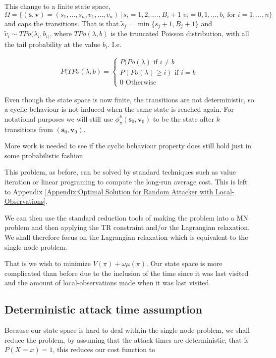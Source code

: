 \documentclass[a4paper,10pt]{article}
\theoremstyle{definition}
\theoremstyle{definition}
\theoremstyle{remark}
\theoremstyle{definition}
\begin{document}
This change to a finite state space, $\Omega = \{ (\bm{s},\bm{v})=(s_{1},...,s_{n},v_{1},...,v_{n}) \, | \, s_{i}=1,2,....,B_{i}+1 \; v_{i}=0,1,...,b_{i}  \text{ for } i=1,...,n\}$ and caps the transitions. That is that $\widetilde{s}_{j}= \min \{s_{j}+1, B_{j}+1 \}$ and $\widetilde{v}_{i} \sim TPo(\lambda_{i},b_{i)}$, where $TPo(\lambda,b)$ is the truncated Poisson distribution, with all the tail probability at the value $b_{i}$. I.e.

\begin{align*}
P(TPo(\lambda,b)=\begin{cases}
P(Po(\lambda) \text{ if } i \neq b \\
P(Po(\lambda) \geq i) \text{ if } i=b \\
0 \text{ Otherwise}
\end{cases}
\end{align*}

Even though the state space is now finite, the transitions are not deterministic, so a cyclic behaviour is not induced when the same state is reached again. For notational purposes we will still use $\phi^{k}_{\pi}(\bm{s}_{0},\bm{v}_{0})$ to be the state after $k$ transitions from $(\bm{s}_{0},\bm{v}_{0})$.

\begin{Huge}
More work is needed to see if the cyclic behaviour property does still hold just in some probabilistic fashion
\end{Huge}

This problem, as before, can be solved by standard techniques such as value iteration or linear programing to compute the long-run average cost. This is left to Appendix \ref{Appendix:Optimal Solution for Random Attacker with Local-Observations}.

We can then use the standard reduction tools of making the problem into a MN problem and then applying the TR constraint and/or the Lagrangian relaxation. We shall therefore focus on the Lagrangian relaxation which is equivalent to the single node problem.

That is we wish to minimize $V(\pi)+\omega \mu(\pi)$. Our state space is more complicated than before due to the inclusion of the time since it was last visited and the amount of local-observations made when it was last visited.

\subsection{Deterministic attack time assumption}
Because our state space is hard to deal with,in the single node problem, we shall reduce the problem, by assuming that the attack times are deterministic, that is $P(X=x)=1$, this reduces our cost function to
\end{document}
